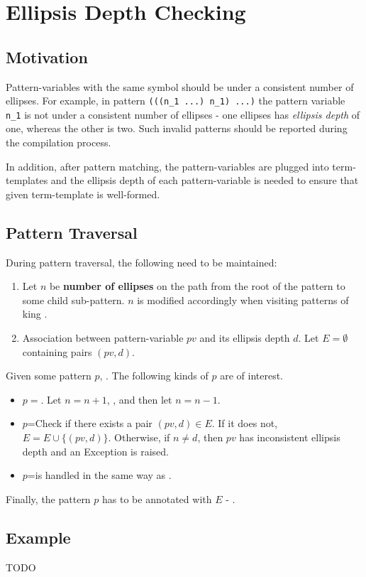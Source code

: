 \section{Ellipsis Depth Checking}

\subsection{Motivation}

Pattern-variables with the same symbol should be under a consistent number of ellipses. For example, in pattern \texttt{(((n\_1 ...) n\_1) ...)} the pattern variable \texttt{n\_1} is not under a consistent number of ellipses - one ellipses has \textit{ellipsis depth} of one, whereas the other is two. Such invalid patterns should be reported during the compilation process.

In addition, after pattern matching, the pattern-variables are plugged into term-templates and the ellipsis depth of each pattern-variable is needed to ensure that given term-template is well-formed.

\subsection{Pattern Traversal}

During pattern traversal, the following need to be maintained:

\begin{enumerate}
\item
Let $n$ be \textbf{number of ellipses} on the path from the root of the pattern to some child sub-pattern. $n$ is modified accordingly when visiting patterns of king \RepeatNoArg.

\item Association between pattern-variable $pv$ and its ellipsis depth $d$. Let $E=\emptyset$ containing pairs $(pv, d)$.
\end{enumerate}

Given some pattern $p$, . The following kinds of $p$ are of interest.
\begin{itemize}
\item $p=$\PatternRepeat. Let $n=n+1$, , and then let $n=n-1$.
\item $p$=\BuiltInPattern Check if there exists a pair $(pv, d) \in E$. If it does not, $E = E \cup \{ (pv, d) \}$. Otherwise, if $n \neq d$, then $pv$ has inconsistent ellipsis depth and an Exception is raised.
\item $p$=\NonTerminal is handled in the same way as \BuiltInPatternNoArg.
\end{itemize}

Finally, the pattern $p$ has to be annotated with $E$ - .

\subsection{Example}

TODO
